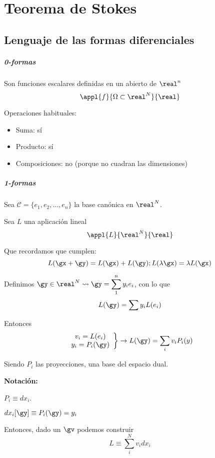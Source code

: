 \chapter{Teorema de Stokes}

\section{Lenguaje de las formas diferenciales}

\paragraph{0-formas}

Son funciones escalares definidas en un abierto de $\real^n$
\[\appl{f}{\Omega\subset\real^N}{\real}\]

Operaciones habituales:
\begin{itemize}
\item Suma: sí
\item Producto: sí
\item Composiciones: no (porque no cuadran las dimensiones)
\end{itemize}

\paragraph{1-formas}

Sea $\mathcal{C} = \{e_1,e_2,...,e_n\}$ la base canónica en $\real^N$.

Sea $L$ una aplicación lineal
\[\appl{L}{\real^N}{\real}\]

Que recordamos que cumplen:
\[ L(\gx+\gy) = L(\gx)+L(\gy); L(\lambda\gx) = \lambda L(\gx)\]

Definimos $\gy\in\real^N \leadsto \gy = \displaystyle\sum_1^n y_i e_i$, con lo que \[L(\gy) = \sum y_i L(e_i)\]

Entonces \[\left.\begin{array}{cc}
v_i = L(e_i)\\
y_i = P_i(\gy)
\end{array}\right\} \rightarrow L(\gy) = \sum_i v_iP_i(y)\]

Siendo $P_i$ las proyecciones, una base del espacio dual.

\textbf{Notación:}

$P_i \equiv dx_i$.

$dx_i[\gy] \equiv P_i(\gy) = y_i$

Entonces, dado un $\gv$ podemos construir 
\[L \equiv \sum_i^N v_idx_i\]


